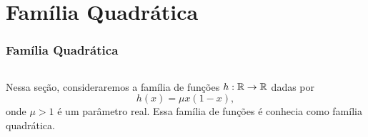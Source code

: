 \section{Família Quadrática}

\begin{frame}
\vspace{5pt}
\frametitle{Família Quadrática}
\begin{columns}
\column{\dimexpr\paperwidth-15pt}

Nessa seção, consideraremos a família de funções $h: \mathbb{R} \to \mathbb{R}$ dadas por
$$h(x) = \mu x(1-x),$$
onde $\mu > 1$ é um parâmetro real.
Essa família de funções é conhecia como família quadrática.

\end{columns}
\end{frame}

